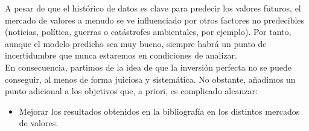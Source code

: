 	A pesar de que el hist\'orico de datos es clave para predecir los valores futuros, el mercado de valores a menudo se ve influenciado por otros factores no predecibles (noticias, pol\'itica, guerras o cat\'astrofes ambientales, por ejemplo). Por tanto, aunque el modelo predicho sea muy bueno, siempre habr\'a un punto de incertidumbre que nunca estaremos en condiciones de analizar.\\
	
	En consecuencia, partimos de la idea de que la inversi\'on perfecta no se puede conseguir, al menos de forma juiciosa y sistem\'atica. No obstante, a\~nadimos un punto adicional a los objetivos que, a priori, es complicado alcanzar:
	
	\begin{itemize}
	    \item Mejorar los resultados obtenidos en la bibliograf\'ia en los distintos mercados de valores.
	\end{itemize}
	
	